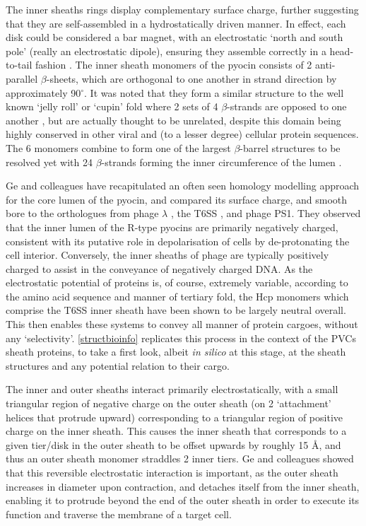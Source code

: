 The inner sheaths rings display complementary surface charge, further suggesting that they are self-assembled in a hydrostatically driven manner. In effect, each disk could be considered a bar magnet, with an electrostatic `north and south pole' (really an electrostatic dipole), ensuring they assemble correctly in a head-to-tail fashion \citep{Ge2015}. The inner sheath monomers of the pyocin consists of 2 anti-parallel $\beta$-sheets, which are orthogonal to one another in strand direction by approximately 90$^{\circ}$. It was noted that they form a similar structure to the well known `jelly roll' or `cupin' fold where 2 sets of 4 $\beta$-strands are opposed to one another \citep{Richardson1981, Dunwell2004}, but are actually thought to be unrelated, despite this domain being highly conserved in other viral and (to a lesser degree) cellular protein sequences. The 6 monomers combine to form one of the largest $\beta$-barrel structures to be resolved yet with 24 $\beta$-strands forming the inner circumference of the lumen \citep{Ge2015}.

Ge and colleagues have recapitulated an often seen homology modelling approach for the core lumen of the pyocin, and compared its surface charge, and smooth bore to the orthologues from phage $\lambda$ \citep{Pell2009a}, the T6SS \citep{Jobichen2010}, and phage PS1. They observed that the inner lumen of the R-type pyocins are primarily negatively charged, consistent with its putative role in depolarisation of cells by de-protonating the cell interior. Conversely, the inner sheaths of phage are typically positively charged to assist in the conveyance of negatively charged DNA. As the electrostatic potential of proteins is, of course, extremely variable, according to the amino acid sequence and manner of tertiary fold, the Hcp monomers which comprise the T6SS inner sheath have been shown to be largely neutral overall. This then enables these systems to convey all manner of protein cargoes, without any `selectivity'. \vref{structbioinfo} replicates this process in the context of the PVCs sheath proteins, to take a first look, albeit \emph{in silico} at this stage, at the sheath structures and any potential relation to their cargo.

The inner and outer sheaths interact primarily electrostatically, with a small triangular region of negative charge on the outer sheath (on 2 `attachment' helices that protrude upward) corresponding to a triangular region of positive charge on the inner sheath. This causes the inner sheath that corresponds to a given tier/disk in the outer sheath to be offset upwards by roughly 15 \AA, and thus an outer sheath monomer straddles 2 inner tiers. Ge and colleagues showed that this reversible electrostatic interaction is important, as the outer sheath increases in diameter upon contraction, and detaches itself from the inner sheath, enabling it to protrude beyond the end of the outer sheath in order to execute its function and traverse the membrane of a target cell.


